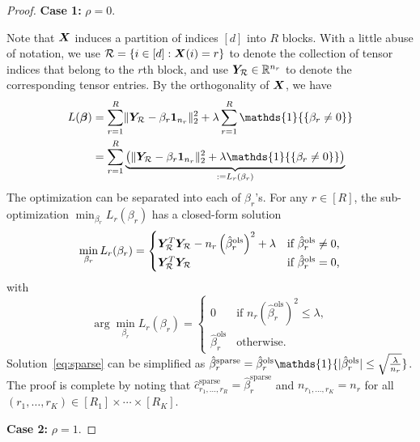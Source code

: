 \documentclass{article}
\newcommand*{\KeepStyleUnderBrace}[1]{%
  \mathop{%
    \mathchoice
    {\underbrace{\displaystyle#1}}%
    {\underbrace{\textstyle#1}}%
    {\underbrace{\scriptstyle#1}}%
    {\underbrace{\scriptscriptstyle#1}}%
  }\limits
}
\begin{document}
\begin{appendices}
\begin{proof}
{\bf Case 1: } $\rho=0$.\par
Note that $\bm X$ induces a partition of indices $[d]$ into $R$ blocks. With a little abuse of notation, we use $\mathcal{R}=\{i\in[d]:\bm X(i)=r\}$ to denote the collection of tensor indices that belong to the $r$th block, and use $\bm Y_{\mathcal{R}}\in\mathbb{R}^{n_r}$ to denote the corresponding tensor entries. By the orthogonality of $\bm X$, we have
\begin{equation}
\begin{split}
L(\boldsymbol{\beta})&=\sum_{r=1}^R \vnormSize{}{\mY_{\tR}-\beta_r\mathbf{1}_{n_r}}^2+\lambda \sum_{r=1}^R \mathds{1}{\{ \beta_r\neq 0\}}\\
&=\sum_{r=1}^R\KeepStyleUnderBrace{\left( \vnormSize{}{\mY_{\tR}-\beta_r\mathbf{1}_{n_r}}^2+\lambda \mathds{1}{\{ \beta_r\neq 0\}}\right)}_{:=L_r(\beta_r)}
\end{split}
\end{equation}
The optimization can be separated into each of $\beta_r$'s. For any $r\in[R]$, the sub-optimization $\min_{\beta_r}L_r(\beta_r)$ has a closed-form solution
\[
\min_{\beta_r} L_r(\beta_r)
=\begin{cases}
\bm Y^T_{\mathcal{R}}\bm Y_{\mathcal{R}}-n_r\left(\hat \beta_r^{\text{ols}}\right)^2+\lambda& \text{if $\hat \beta^{\text{ols}}_r\neq 0$,}\\
\bm Y^T_{\mathcal{R}}\bm Y_{\mathcal{R}}&\text{if $\hat \beta^{\text{ols}}_r=0$,}
\end{cases}
\]
with
\begin{equation}\label{eq:sparse}
\arg\min_{\beta_r} L_r(\beta_r)=
\begin{cases}
0\quad& \text{if $n_r\left(\hat \beta_r^{\text{ols}}\right)^2 \leq \lambda$},\\
\hat \beta_r^{\text{ols}} &\text{otherwise}.
\end{cases}
\end{equation}
Solution~\eqref{eq:sparse} can be simplified as $\hat \beta^{\text{sparse}}_r=\hat \beta^{\text{ols}}_r\mathds{1}\{|\hat \beta^{\text{ols}}_r| \leq \sqrt{\lambda \over n_r}\}$. The proof is complete by noting that $\hat c^{\text{sparse}}_{r_1,\ldots,r_R}=\hat \beta^{\text{sparse}}_r$ and $n_{r_1,\ldots,r_K}=n_r$ for all $(r_1,\ldots,r_K)\in[R_1]\times \cdots \times [R_K]$.



{\bf Case 2: } $\rho=1$.\par


\end{proof}
\end{appendices}
\end{document}

